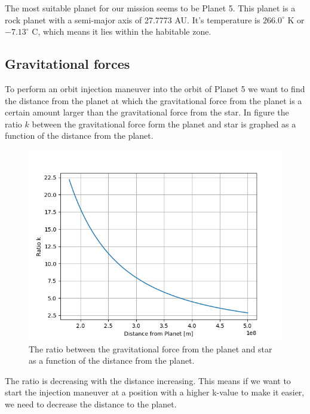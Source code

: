 \documentclass[reprint,english,notitlepage]{revtex4-2}
\begin{document}
	The most suitable planet for our mission seems to be Planet 5.
	This planet is a rock planet with a semi-major axis of 27.7773 AU.
	It's temperature is $266.0^{\circ}$ K or $-7.13^{\circ}$ C, which means it lies within the habitable zone.\\


\subsection{Gravitational forces}\label{subsec:gravitational-forces}
	To perform an orbit injection maneuver into the orbit of Planet 5 we want to find the distance from the planet at which the gravitational force from the planet is a certain amount larger than the gravitational force from the star.
	In figure the ratio $k$ between the gravitational force form the planet and star is graphed as a function of the distance from the planet.

	\begin{figure}[h]
		\centering
		\includegraphics[scale=0.4]{Figures/Grav_ratio_k}
		\caption{The ratio between the gravitational force from the planet and star as a function of the distance from the planet.}\label{fig:k_ratio_dist}
	\end{figure}

	The ratio is decreasing with the distance increasing.
	This means if we want to start the injection maneuver at a position with a higher k-value to make it easier, we need to decrease the distance to the planet.
\end{document}
